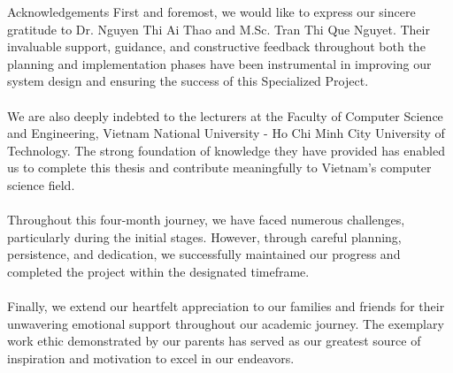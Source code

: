 \begin{preface}{Acknowledgements}
First and foremost, we would like to express our sincere gratitude to Dr. Nguyen Thi Ai Thao and M.Sc. Tran Thi Que Nguyet. Their invaluable support, guidance, and constructive feedback throughout both the planning and implementation phases have been instrumental in improving our system design and ensuring the success of this Specialized Project.
\\
\\
We are also deeply indebted to the lecturers at the Faculty of Computer Science and Engineering, Vietnam National University - Ho Chi Minh City University of Technology. The strong foundation of knowledge they have provided has enabled us to complete this thesis and contribute meaningfully to Vietnam's computer science field.
\\
\\
Throughout this four-month journey, we have faced numerous challenges, particularly during the initial stages. However, through careful planning, persistence, and dedication, we successfully maintained our progress and completed the project within the designated timeframe.
\\
\\
Finally, we extend our heartfelt appreciation to our families and friends for their unwavering emotional support throughout our academic journey. The exemplary work ethic demonstrated by our parents has served as our greatest source of inspiration and motivation to excel in our endeavors.
\end{preface}
